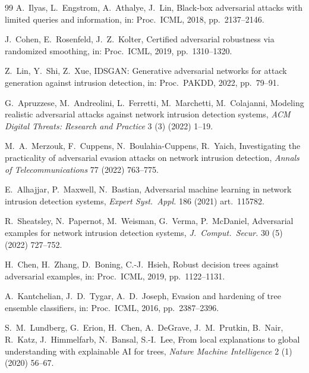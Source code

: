 \documentclass[preprint,12pt,authoryear]{elsarticle}
\begin{document}
\begin{thebibliography}{99}
A.~Ilyas, L.~Engstrom, A.~Athalye, J.~Lin, Black-box adversarial attacks with
limited queries and information, in: Proc.\ ICML, 2018, pp.~2137--2146.

J.~Cohen, E.~Rosenfeld, J.~Z.~Kolter, Certified adversarial robustness via
randomized smoothing, in: Proc.\ ICML, 2019, pp.~1310--1320.

Z.~Lin, Y.~Shi, Z.~Xue, IDSGAN: Generative adversarial networks for attack
generation against intrusion detection, in: Proc.\ PAKDD, 2022, pp.~79--91.

G.~Apruzzese, M.~Andreolini, L.~Ferretti, M.~Marchetti, M.~Colajanni, Modeling
realistic adversarial attacks against network intrusion detection systems,
\textit{ACM Digital Threats: Research and Practice} 3 (3) (2022) 1--19.

M.~A.~Merzouk, F.~Cuppens, N.~Boulahia-Cuppens, R.~Yaich, Investigating the
practicality of adversarial evasion attacks on network intrusion detection,
\textit{Annals of Telecommunications} 77 (2022) 763--775.

E.~Alhajjar, P.~Maxwell, N.~Bastian, Adversarial machine learning in network
intrusion detection systems, \textit{Expert Syst.\ Appl.} 186 (2021) art.~115782.

R.~Sheatsley, N.~Papernot, M.~Weisman, G.~Verma, P.~McDaniel, Adversarial examples
for network intrusion detection systems, \textit{J.\ Comput.\ Secur.} 30 (5) (2022)
727--752.

H.~Chen, H.~Zhang, D.~Boning, C.-J.~Hsieh, Robust decision trees against
adversarial examples, in: Proc.\ ICML, 2019, pp.~1122--1131.

A.~Kantchelian, J.~D.~Tygar, A.~D.~Joseph, Evasion and hardening of tree ensemble
classifiers, in: Proc.\ ICML, 2016, pp.~2387--2396.

S.~M.~Lundberg, G.~Erion, H.~Chen, A.~DeGrave, J.~M.~Prutkin, B.~Nair, R.~Katz,
J.~Himmelfarb, N.~Bansal, S.-I.~Lee, From local explanations to global understanding
with explainable AI for trees, \textit{Nature Machine Intelligence} 2 (1) (2020)
56--67.


\end{thebibliography}
\end{document}
